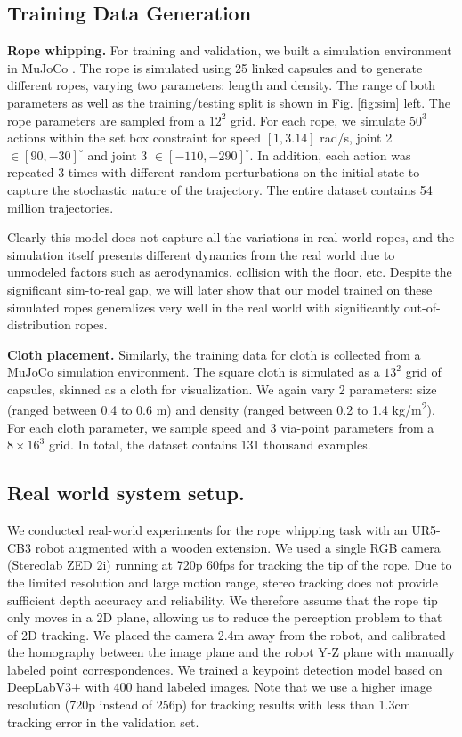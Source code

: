 \subsection{Training Data Generation}
\label{sec:data_generation}

\textbf{Rope whipping.}
For training and validation, we built a simulation environment in MuJoCo \cite{mujoco}. The rope is simulated using 25 linked capsules and to generate different ropes, varying two parameters: length and density. The range of both parameters as well as the training/testing split is shown in Fig. \ref{fig:sim} left.  
The rope parameters are sampled from a $12^2$ grid. For each rope, we simulate $50^3$ actions within the set box constraint for speed $[1,3.14]$ \si{ rad/s}, joint 2 $ \in [90, -30]^{\circ}$ and joint 3 $\in [-110, -290]^{\circ}$. In addition, each action was repeated 3 times with different random perturbations on the initial state to capture the stochastic nature of the trajectory. The entire dataset contains 54 million trajectories.

Clearly this model does not capture all the variations in real-world ropes, and the simulation itself presents different dynamics from the real world due to unmodeled factors such as aerodynamics, collision with the floor, etc. Despite the significant sim-to-real gap, we will later show that our model trained on these simulated ropes generalizes very well in the real world with significantly out-of-distribution ropes. %

\textbf{Cloth placement.}
Similarly, the training data for cloth is collected from a MuJoCo simulation environment. The square cloth is simulated as a $13^2$ grid of capsules, skinned as a cloth for visualization. We again vary 2 parameters: size (ranged between 0.4 to 0.6 m) and density (ranged between 0.2 to 1.4 \si{kg/m^2}). For each cloth parameter, we sample speed and 3 via-point parameters from a $8\times16^3$ grid. In total, the dataset contains 131 thousand examples.

\subsection{Real world system setup.}
We conducted real-world experiments for the rope whipping task with an UR5-CB3 robot augmented with a wooden extension. We used a single RGB camera (Stereolab ZED 2i) running at 720p 60fps for tracking the tip of the rope. Due to the limited resolution and large motion range, stereo tracking does not provide sufficient depth accuracy and reliability. We therefore assume that the rope tip only moves in a 2D plane, allowing us to reduce the perception problem to that of 2D tracking. We placed the camera 2.4m away from the robot, and calibrated the homography between the image plane and the robot Y-Z plane with manually labeled point correspondences. We trained a keypoint detection model based on DeepLabV3+ with 400 hand labeled images.
Note that we use a higher image resolution (720p instead of 256p) for tracking results with less than 1.3cm tracking error in the validation set.

